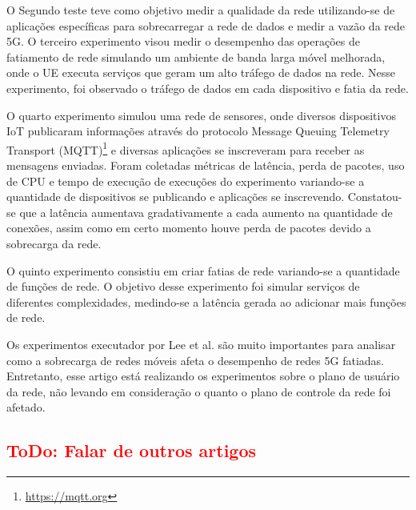 O Segundo teste teve como objetivo medir a qualidade da rede utilizando-se de aplicações específicas para sobrecarregar a rede de dados e medir a vazão da rede 5G.
O terceiro experimento visou medir o desempenho das operações de fatiamento de rede simulando um ambiente de banda larga móvel melhorada, onde o UE executa serviços que geram um alto tráfego de dados na rede.
Nesse experimento, foi observado o tráfego de dados em cada dispositivo e fatia da rede.

O quarto experimento simulou uma rede de sensores, onde diversos dispositivos IoT publicaram informações através do protocolo Message Queuing Telemetry Transport (MQTT)\footnote{\url{https://mqtt.org}} e diversas aplicações se inscreveram para receber as mensagens enviadas.
Foram coletadas métricas de latência, perda de pacotes, uso de CPU e tempo de execução de execuções do experimento variando-se a quantidade de dispositivos se publicando e aplicações se inscrevendo.
Constatou-se que a latência aumentava gradativamente a cada aumento na quantidade de conexões, assim como em certo momento houve perda de pacotes devido a sobrecarga da rede.

O quinto experimento consistiu em criar fatias de rede variando-se a quantidade de funções de rede.
O objetivo desse experimento foi simular serviços de diferentes complexidades, medindo-se a latência gerada ao adicionar mais funções de rede.

Os experimentos executador por Lee et al. são muito importantes para analisar como a sobrecarga de redes móveis afeta o desempenho de redes 5G fatiadas.
Entretanto, esse artigo está realizando os experimentos sobre o plano de usuário da rede, não levando em consideração o quanto o plano de controle da rede foi afetado.

\subsection{\textcolor{red}{ToDo: Falar de outros artigos}}



